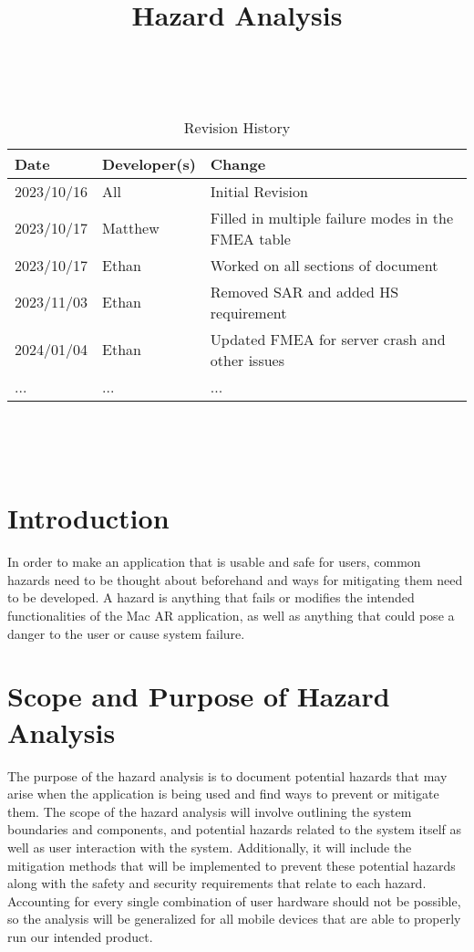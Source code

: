 \documentclass{article}
\title{Hazard Analysis\\\progname}
\author{\authname}
\date{}
\begin{document}
\maketitle
\thispagestyle{empty}

~\newpage


\begin{table}[hp]
\caption{Revision History} \label{TblRevisionHistory}
\begin{tabularx}{\textwidth}{llX}
\toprule
\textbf{Date} & \textbf{Developer(s)} & \textbf{Change}\\
\midrule
2023/10/16 & All & Initial Revision\\
2023/10/17 & Matthew & Filled in multiple failure modes in the FMEA table \\
2023/10/17 & Ethan & Worked on all sections of document \\
2023/11/03 & Ethan & Removed SAR and added HS requirement \\
2024/01/04 & Ethan & Updated FMEA for server crash and other issues\\
... & ... & ...\\
\bottomrule
\end{tabularx}
\end{table}

~\newpage

\tableofcontents

~\newpage



\section{Introduction}


In order to make an application that is usable and safe for users, common hazards need to be thought about beforehand and ways for mitigating them need to be developed. A hazard is anything that fails or modifies the intended functionalities of the Mac AR application, as well as anything that could pose a danger to the user or cause system failure.

\section{Scope and Purpose of Hazard Analysis}
The purpose of the hazard analysis is to document potential hazards that may arise when the application is being used and find ways to prevent or mitigate them. The scope of the hazard analysis will involve outlining the system boundaries and components, and potential hazards related to the system itself as well as user interaction with the system. Additionally, it will include the mitigation methods that will be implemented to prevent these potential hazards along with the safety and security requirements that relate to each hazard. Accounting for every single combination of user hardware should not be possible, so the analysis will be generalized for all mobile devices that are able to properly run our intended product.
\end{document}
